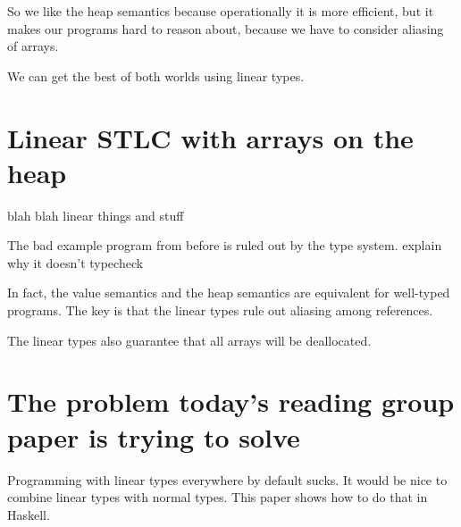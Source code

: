 \documentclass{article}
\newcommand{\todo}[1]{{\color{red} #1}}
\begin{document}
So we like the heap semantics because operationally it is more
efficient, but it makes our programs hard to reason about, because we
have to consider aliasing of arrays.

We can get the best of both worlds using linear types.

\section*{Linear STLC with arrays on the heap}

\vspace{1cm}
\todo{blah blah linear things and stuff}
\vspace{1cm}

The bad example program from before is ruled out by the type
system. \todo{explain why it doesn't typecheck}

In fact, the value semantics and the heap semantics are equivalent for
well-typed programs. The key is that the linear types rule out
aliasing among references.

The linear types also guarantee that all arrays will be deallocated.

\section*{The problem today's reading group paper is trying to solve}

Programming with linear types everywhere by default sucks. It would be nice
to combine linear types with normal types. This paper shows how to do that
in Haskell.
\end{document}
